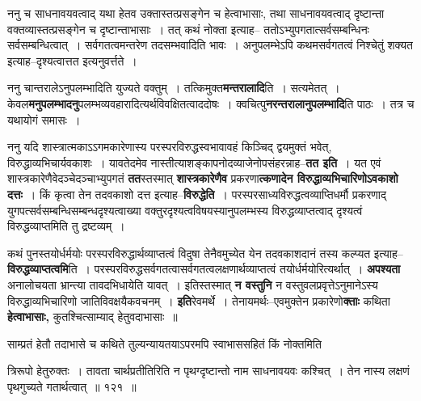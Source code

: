 \documentclass[article,12pt,a4paper]{memoir}
\begin{document}
	ननु च साधनावयवत्वाद् यथा हेतव उक्तास्तत्प्रसङ्गेन च हेत्वाभासाः, तथा साधनावयवत्वाद् दृष्टान्ता वक्तव्यास्तत्प्रसङ्गेन च दृष्टान्ताभासाः । तत् कथं नोक्ता इत्याह-- ततोऽभ्युपगतात्सर्वसम्बन्धिनः सर्वसम्बन्धित्वात् । सर्वगतत्वमन्तरेण तदसम्भवादिति भावः । अनुपलम्भेऽपि कथमसर्वगतत्वं निश्चेतुं शक्यत इत्याह--दृश्यत्वात्तत इत्यनुवर्त्तते ।
	\pend
      

	  \pstart ननु चान्तरालेऽनुपलम्भादिति युज्यते वक्तुम् । तत्किमुक्त\textbf{मन्तरालादि}ति । सत्यमेतत् । केवल\textbf{मनुपलम्भादनु}पलम्भव्यवहारादित्यर्थविवक्षितत्वाददोषः । क्वचित्पु\textbf{नरन्तरालानुपलम्भादि}ति पाठः । तत्र च यथायोगं समासः ।
	\pend
      

	  \pstart ननु यदि शास्त्रात्मकाऽऽगमकारेणास्य परस्परविरुद्धस्वभावावहं किञ्चिद् द्वयमुक्तं भवेत्, विरुद्धाव्यभिचार्यवकाशः । यावतेदमेव नास्तीत्याशङ्कापनोदव्याजेनोपसंहरन्नाह--\textbf{तत इति} । \leavevmode{} यत एवं शास्त्रकारेणैवेदञ्चेदञ्चाभ्युपगतं \textbf{तत}स्तस्मात् \textbf{शास्त्रकारेणैव} प्रकरणा\textbf{त्कणादेन विरुद्धाव्यभिचारिणोऽवकाशो दत्तः} । किं कृत्वा तेन तदवकाशो दत्त इत्याह--\textbf{विरुद्धेति} । परस्परसाध्यविरुद्धत्वव्याप्तिधर्मौ प्रकरणाद् युगपत्सर्वसम्बन्धिसम्बन्धदृश्यत्वाख्या  वक्तुरदृश्यत्वविषयस्यानुपलम्भस्य विरुद्धव्याप्तत्वाद् दृश्यत्वं विरुद्धव्याप्तमिति तु द्रष्टव्यम् ।
	\pend
      

	  \pstart कथं पुनस्तयोर्धर्मयोः परस्परविरुद्धार्थव्याप्तत्वं विदुषा तेनैवमुच्येत येन तदवकाशदानं तस्य कल्प्यत इत्याह--\textbf{विरुद्धव्याप्तत्वमि}ति । परस्परविरुद्धसर्वगतत्वासर्वगतत्वलक्षणार्थव्याप्तत्वं तयोर्धर्मयोरित्यर्थात् । \textbf{अपश्यता} अनालोचयता भ्रान्त्या तावदभिधायेति यावत् । इतिस्तस्मात् \textbf{न वस्तुनि} न वस्तुवलप्रवृत्तेऽनुमानेऽस्य विरुद्धाव्यभिचारिणो जातिविवक्षयैकवचनम् । \textbf{इति}रेवमर्थे । तेनायमर्थः--एवमुक्तेन प्रकारेणो\textbf{क्ताः} कथिता \textbf{हेत्वाभासाः,} कुतश्चित्साम्याद् हेतुवदाभासाः ॥
	\pend
      

	  \pstart साम्प्रतं हेतौ तदाभासे च कथिते तुल्यन्यायतयाऽपरमपि स्वाभाससहितं किं नोक्तमिति  \leavevmode{} 
	  
	त्रिरूपो हेतुरुक्तः । तावता चार्थप्रतीतिरिति न पृथग्दृष्टान्तो नाम साधनावयवः कश्चित् । तेन नास्य लक्षणं पृथगुच्यते गतार्थत्वात् ॥ १२१ ॥ 
	  
\end{document}
